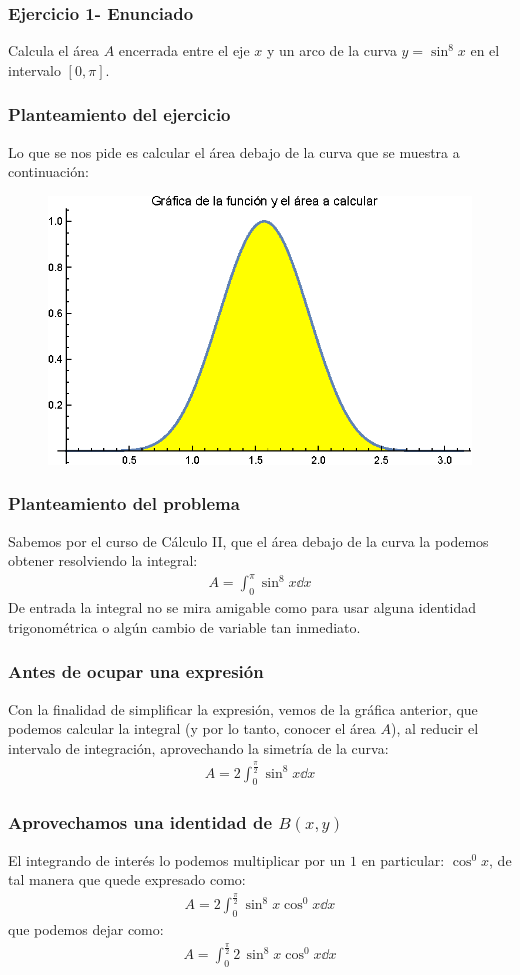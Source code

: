 \begin{frame}
\frametitle{Ejercicio 1-  Enunciado}
Calcula el área $A$ encerrada entre el eje $x$ y un arco de la curva $y = \sin^{8} x$ en el intervalo $[0, \pi]$.
\end{frame}
\begin{frame}
\frametitle{Planteamiento del ejercicio}
Lo que se nos pide es calcular el área debajo de la curva que se muestra a continuación:
\begin{figure}
    \centering
    \includegraphics[scale=0.9]{Imagenes/Asesoria_03_01.eps}
\end{figure}
\end{frame}
\begin{frame}
\frametitle{Planteamiento del problema}
Sabemos por el curso de Cálculo II, que el área debajo de la curva la podemos obtener resolviendo la integral:
\begin{align*}
A = \int_{0}^{\pi} \sin^{8} x \dd{x}
\end{align*}
\pause
De entrada la integral no se mira amigable como para usar alguna identidad trigonométrica o algún cambio de variable tan inmediato.
\end{frame}
\begin{frame}
\frametitle{Antes de ocupar una expresión}
Con la finalidad de simplificar la expresión, vemos de la gráfica anterior, que podemos calcular la integral (y por lo tanto, conocer el área $A$), al reducir el intervalo de integración, aprovechando la simetría de la curva:
\begin{align*}
A = 2 \int_{0}^{\frac{\pi}{2}} \sin^{8} x \dd{x}
\end{align*}
\end{frame}
\begin{frame}
\frametitle{Aprovechamos una identidad de $B(x,y)$}
El integrando de interés lo podemos multiplicar por un $1$ en particular: $\cos^{0} x$, de tal manera que quede expresado como:
\begin{align*}
A = 2 \int_{0}^{\frac{\pi}{2}} \sin^{8} x \cos^{0} x \dd{x}
\end{align*}
\pause
que podemos dejar como:
\begin{align*}
A = \int_{0}^{\frac{\pi}{2}} 2 \, \sin^{8} x \cos^{0} x \dd{x}
\end{align*}
\end{frame}
